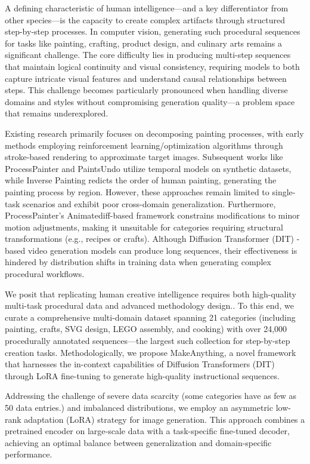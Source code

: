 A defining characteristic of human intelligence—and a key differentiator from other species—is the capacity to create complex artifacts through structured step-by-step processes. In computer vision, generating such procedural sequences for tasks like painting, crafting, product design, and culinary arts remains a significant challenge. The core difficulty lies in producing multi-step sequences that maintain logical continuity and visual consistency, requiring models to both capture intricate visual features and understand causal relationships between steps. This challenge becomes particularly pronounced when handling diverse domains and styles without compromising generation quality—a problem space that remains underexplored.

Existing research primarily focuses on decomposing painting processes, with early methods employing reinforcement learning/optimization algorithms through stroke-based rendering to approximate target images. Subsequent works like ProcessPainter \cite{processpainter} and PaintsUndo \cite{paintsundo} utilize temporal models on synthetic datasets, while Inverse Painting \cite{inverse}redicts the order of human painting, generating the painting process by region. However, these approaches remain limited to single-task scenarios and exhibit poor cross-domain generalization. Furthermore, ProcessPainter's Animatediff-based framework constrains modifications to minor motion adjustments, making it unsuitable for categories requiring structural transformations (e.g., recipes or crafts). Although Diffusion Transformer (DIT) \cite{dit}-based video generation models can produce long sequences, their effectiveness is hindered by distribution shifts in training data when generating complex procedural workflows.

We posit that replicating human creative intelligence requires both high-quality multi-task procedural data and advanced methodology design.. To this end, we curate a comprehensive multi-domain dataset spanning 21 categories (including painting, crafts, SVG design, LEGO assembly, and cooking) with over 24,000 procedurally annotated sequences—the largest such collection for step-by-step creation tasks. Methodologically, we propose MakeAnything, a novel framework that harnesses the in-context capabilities of Diffusion Transformers (DIT) through LoRA fine-tuning to generate high-quality instructional sequences.

Addressing the challenge of severe data scarcity (some categories have as few as 50 data entries.) and imbalanced distributions, we employ an asymmetric low-rank adaptation (LoRA)\cite{asymmetry, lora} strategy for image generation. This approach combines a pretrained encoder on large-scale data with a task-specific fine-tuned decoder, achieving an optimal balance between generalization and domain-specific performance.


